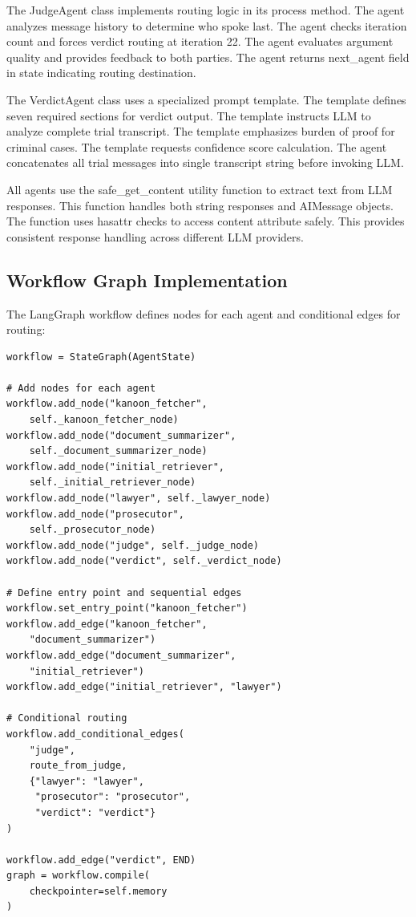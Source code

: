 \documentclass[12pt,singleside,a4paper]{article}
\begin{document}
The JudgeAgent class implements routing logic in its process method. The agent analyzes message history to determine who spoke last. The agent checks iteration count and forces verdict routing at iteration 22. The agent evaluates argument quality and provides feedback to both parties. The agent returns next\_agent field in state indicating routing destination.

The VerdictAgent class uses a specialized prompt template. The template defines seven required sections for verdict output. The template instructs LLM to analyze complete trial transcript. The template emphasizes burden of proof for criminal cases. The template requests confidence score calculation. The agent concatenates all trial messages into single transcript string before invoking LLM.

All agents use the safe\_get\_content utility function to extract text from LLM responses. This function handles both string responses and AIMessage objects. The function uses hasattr checks to access content attribute safely. This provides consistent response handling across different LLM providers.

\subsection{Workflow Graph Implementation}
The LangGraph workflow defines nodes for each agent and conditional edges for routing:

\begin{lstlisting}
workflow = StateGraph(AgentState)

# Add nodes for each agent
workflow.add_node("kanoon_fetcher", 
    self._kanoon_fetcher_node)
workflow.add_node("document_summarizer", 
    self._document_summarizer_node)
workflow.add_node("initial_retriever", 
    self._initial_retriever_node)
workflow.add_node("lawyer", self._lawyer_node)
workflow.add_node("prosecutor", 
    self._prosecutor_node)
workflow.add_node("judge", self._judge_node)
workflow.add_node("verdict", self._verdict_node)

# Define entry point and sequential edges
workflow.set_entry_point("kanoon_fetcher")
workflow.add_edge("kanoon_fetcher", 
    "document_summarizer")
workflow.add_edge("document_summarizer", 
    "initial_retriever")
workflow.add_edge("initial_retriever", "lawyer")

# Conditional routing
workflow.add_conditional_edges(
    "judge",
    route_from_judge,
    {"lawyer": "lawyer",
     "prosecutor": "prosecutor",
     "verdict": "verdict"}
)

workflow.add_edge("verdict", END)
graph = workflow.compile(
    checkpointer=self.memory
)
\end{lstlisting}
\end{document}
